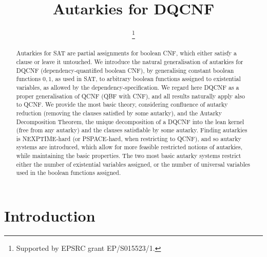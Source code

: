 \documentclass[conference]{IEEEtran}
\begin{document}
\title{Autarkies for DQCNF}


\author{\thanks{Supported by EPSRC grant EP/S015523/1.}
\and
{}
}

\maketitle

\begin{abstract}
  Autarkies for SAT are partial assignments for boolean CNF, which either satisfy a clause or leave it untouched.
  We introduce the natural generalisation of autarkies for DQCNF (dependency-quantified boolean CNF), by generalising constant boolean functions $0, 1$, as used in SAT, to arbitrary boolean functions assigned to existential variables, as allowed by the dependency-specification.
  We regard here DQCNF as a proper generalisation of QCNF (QBF with CNF), and all results naturally apply also to QCNF.
  We provide the most basic theory, considering confluence of autarky reduction (removing the clauses satisfied by some autarky), and the Autarky Decomposition Theorem, the unique decomposition of a DQCNF into the lean kernel (free from any autarky) and the clauses satisfiable by some autarky.
  Finding autarkies is NEXPTIME-hard (or PSPACE-hard, when restricting to QCNF), and so autarky systems are introduced, which allow for more feasible restricted notions of autarkies, while maintaining the basic properties.
  The two most basic autarky systems restrict either the number of existential variables assigned, or the number of universal variables used in the boolean functions assigned.
\end{abstract}



\section{Introduction}
\label{sec:Intro}
\end{document}
